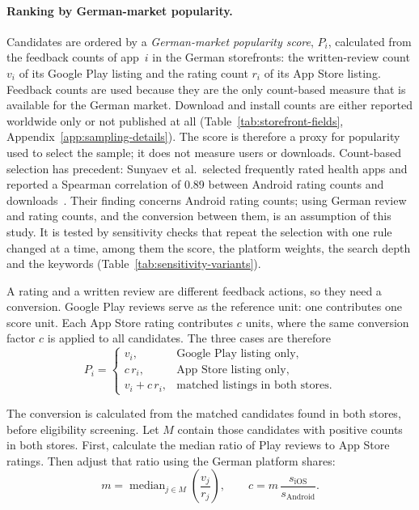 \paragraph{Ranking by German-market popularity.} Candidates are ordered by a
\emph{German-market popularity score}, $P_i$, calculated from the feedback
counts of app~$i$ in the German storefronts: the written-review count $v_i$ of its Google Play
listing and the rating count $r_i$ of its App Store listing. Feedback counts are used because
they are the only count-based measure that is available for the German market. Download and
install counts are either reported worldwide only or not published at all
(Table~\ref{tab:storefront-fields}, Appendix~\ref{app:sampling-details}). The score is
therefore a proxy for popularity used to select the sample; it does not measure
users or downloads. Count-based selection has precedent: Sunyaev et
al.\ selected frequently rated health apps and reported a Spearman correlation
of 0.89 between Android rating counts and downloads~\parencite{sunyaev2015availability}.
Their finding concerns Android rating counts; using German review and rating counts, and the
conversion between them, is an assumption of this study. It is tested by sensitivity checks
that repeat the selection with one rule changed at a time, among them the score, the platform
weights, the search depth and the keywords (Table~\ref{tab:sensitivity-variants}).

A rating and a written review are different feedback actions, so they need a
conversion. Google Play reviews serve as the reference unit: one contributes one score unit. Each App Store
rating contributes $c$ units, where the same conversion factor $c$ is applied
to all candidates. The three cases are therefore
\[
  P_i =
  \begin{cases}
    v_i, & \text{Google Play listing only},\\
    c\,r_i, & \text{App Store listing only},\\
    v_i+c\,r_i, & \text{matched listings in both stores}.
  \end{cases}
\]

The conversion is calculated from the matched candidates found in both stores,
before eligibility screening. Let $M$ contain those candidates with positive
counts in both stores. First, calculate the median ratio of Play reviews to
App Store ratings. Then adjust that ratio using the German platform shares:
\[
  m = \operatorname{median}_{j\in M}\!\left(\frac{v_j}{r_j}\right),
  \qquad
  c = m\,\frac{s_{\mathrm{iOS}}}{s_{\mathrm{Android}}}.
\]

